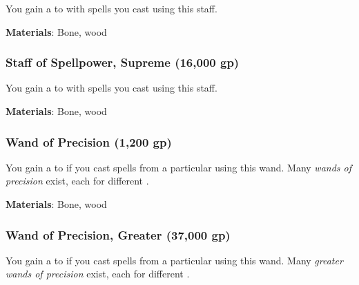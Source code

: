 You gain a   to  with spells you cast using this staff.



\vspace{0.25em}
\textbf{Materials}: Bone, wood


\lowercase{\hypertarget{item:Staff of Spellpower, Supreme}{}}\label{item:Staff of Spellpower, Supreme}
\hypertarget{item:Staff of Spellpower, Supreme}{\subsubsection{Staff of Spellpower, Supreme\hfill{} (16,000 gp)}}

You gain a   to  with spells you cast using this staff.



\vspace{0.25em}
\textbf{Materials}: Bone, wood


\lowercase{\hypertarget{item:Wand of Precision}{}}\label{item:Wand of Precision}
\hypertarget{item:Wand of Precision}{\subsubsection{Wand of Precision\hfill{} (1,200 gp)}}

You gain a   to  if you cast spells from a particular  using this wand.
Many \textit{wands of precision} exist, each for different .



\vspace{0.25em}
\textbf{Materials}: Bone, wood


\lowercase{\hypertarget{item:Wand of Precision, Greater}{}}\label{item:Wand of Precision, Greater}
\hypertarget{item:Wand of Precision, Greater}{\subsubsection{Wand of Precision, Greater\hfill{} (37,000 gp)}}

You gain a   to  if you cast spells from a particular  using this wand.
Many \textit{greater wands of precision} exist, each for different .



